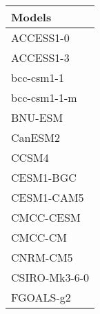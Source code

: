 \documentclass{ametsocV5}
\begin{document}

\begin{table}[t]
\begin{center}
  \renewcommand{\arraystretch}{1.0}
  \begin{tabular}{ l }
    Models          \\%
    \hline
    ACCESS1-0       \\%
    ACCESS1-3       \\%
    bcc-csm1-1      \\%
    bcc-csm1-1-m    \\%
    BNU-ESM         \\%
    CanESM2         \\%
    CCSM4           \\%
    CESM1-BGC       \\%
    CESM1-CAM5      \\%
    CMCC-CESM       \\%
    CMCC-CM         \\%
    CNRM-CM5        \\%
    CSIRO-Mk3-6-0   \\%
    FGOALS-g2       \\%

\end{tabular}
\end{center}
\end{table}
\end{document}
